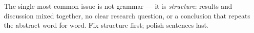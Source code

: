 \begin{pitfallbox}
      The single most common issue is not grammar --- it is \emph{structure}:
      results and discussion mixed together, no clear research question, or a
      conclusion that repeats the abstract word for word. Fix structure first;
      polish sentences last.
\end{pitfallbox}
